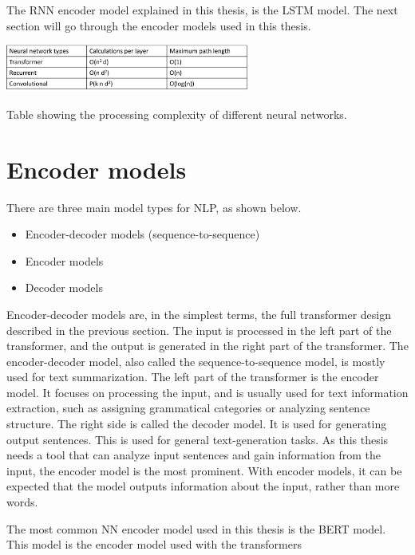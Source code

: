 The RNN encoder model explained in this thesis, is the LSTM model. The next section will go through the encoder models used in this thesis.



\begin{table}[ht]
    \centering
    \includegraphics[width=8cm]{img/process_complexity.png}
    \caption{Table showing the processing complexity of different neural networks.}
    \label{table:calculation_complexity}
\end{table}

\section{Encoder models} \label{sec:ED}
There are three main model types for NLP, as shown below.

\begin{itemize}
    \item Encoder-decoder models (sequence-to-sequence)
    \item Encoder models
    \item Decoder models
\end{itemize}

Encoder-decoder models are, in the simplest terms, the full transformer design described in the previous section. The input is processed in the left part of the transformer, and the output is generated in the right part of the transformer. The encoder-decoder model, also called the sequence-to-sequence model, is mostly used for text summarization. The left part of the transformer is the encoder model. It focuses on processing the input, and is usually used for text information extraction, such as assigning grammatical categories or analyzing sentence structure. The right side is called the decoder model. It is used for generating output sentences. This is used for general text-generation tasks.
As this thesis needs a tool that can analyze input sentences and gain information from the input, the encoder model is the most prominent. With encoder models, it can be expected that the model outputs information about the input, rather than more words.

The most common NN encoder model used in this thesis is the BERT model. This model is the encoder model used with the transformers




